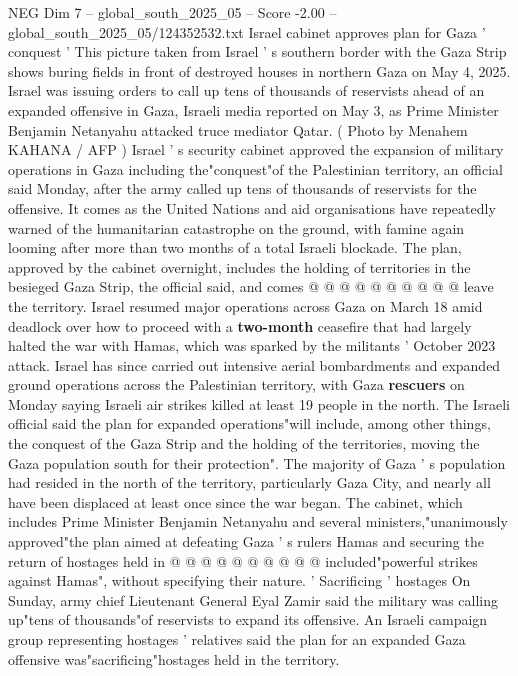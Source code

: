 \begin{textsample}{NEG Dim 7 – global\_south\_2025\_05 – Score -2.00 – global\_south\_2025\_05/124352532.txt}  \label{ex:f7_neg_008}
Israel cabinet approves plan for Gaza ' conquest ' This picture taken from Israel ' s southern border with the Gaza Strip shows buring fields in front of destroyed houses in northern Gaza on May 4, 2025.
Israel was issuing orders to call up tens of thousands of reservists ahead of an expanded offensive in Gaza, Israeli media reported on May 3, as Prime Minister Benjamin Netanyahu attacked truce mediator Qatar. ( Photo by Menahem KAHANA / AFP ) Israel ' s security cabinet approved the expansion of military operations in Gaza including the"conquest"of the Palestinian territory, an official said Monday, after the army called up tens of thousands of reservists for the offensive.
It comes as the United Nations and aid organisations have repeatedly warned of the humanitarian catastrophe on the ground, with famine again looming after more than two months of a total Israeli blockade.
The plan, approved by the cabinet overnight, includes the holding of territories in the besieged Gaza Strip, the official said, and comes @ @ @ @ @ @ @ @ @ @ leave the territory.
Israel resumed major operations across Gaza on March 18 amid deadlock over how to proceed with a \textbf{two-month} ceasefire that had largely halted the war with Hamas, which was sparked by the militants ' October 2023 attack.
Israel has since carried out intensive aerial bombardments and expanded ground operations across the Palestinian territory, with Gaza \textbf{rescuers} on Monday saying Israeli air strikes killed at least 19 people in the north.
The Israeli official said the plan for expanded operations"will include, among other things, the conquest of the Gaza Strip and the holding of the territories, moving the Gaza population south for their protection".
The majority of Gaza ' s population had resided in the north of the territory, particularly Gaza City, and nearly all have been displaced at least once since the war began.
The cabinet, which includes Prime Minister Benjamin Netanyahu and several ministers,"unanimously approved"the plan aimed at defeating Gaza ' s rulers Hamas and securing the return of hostages held in @ @ @ @ @ @ @ @ @ @ included"powerful strikes against Hamas", without specifying their nature. ' Sacrificing ' hostages On Sunday, army chief Lieutenant General Eyal Zamir said the military was calling up"tens of thousands"of reservists to expand its offensive.
An Israeli campaign group representing hostages ' relatives said the plan for an expanded Gaza offensive was"sacrificing"hostages held in the territory.

\end{textsample}
